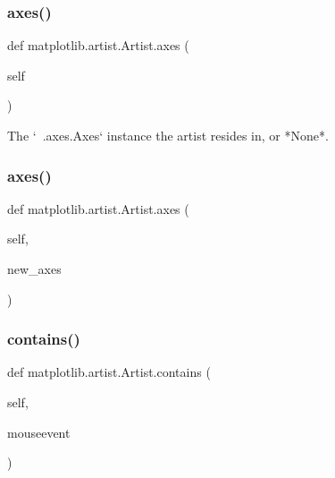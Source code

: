 \subsubsection{\texorpdfstring{axes()}{axes()}\hspace{0.1cm}{\footnotesize\ttfamily [1/2]}}
{\footnotesize\ttfamily def matplotlib.\+artist.\+Artist.\+axes (\begin{DoxyParamCaption}\item[{}]{self }\end{DoxyParamCaption})}

\begin{DoxyVerb}The `~.axes.Axes` instance the artist resides in, or *None*.\end{DoxyVerb}
 \mbox{\label{classmatplotlib_1_1artist_1_1Artist_a522c38874d287df85bbf5af7c770a3e7}} 
\subsubsection{\texorpdfstring{axes()}{axes()}\hspace{0.1cm}{\footnotesize\ttfamily [2/2]}}
{\footnotesize\ttfamily def matplotlib.\+artist.\+Artist.\+axes (\begin{DoxyParamCaption}\item[{}]{self,  }\item[{}]{new\+\_\+axes }\end{DoxyParamCaption})}

\mbox{\label{classmatplotlib_1_1artist_1_1Artist_a0147afb4ab2383f87c613a8790df3448}} 
\subsubsection{\texorpdfstring{contains()}{contains()}}
{\footnotesize\ttfamily def matplotlib.\+artist.\+Artist.\+contains (\begin{DoxyParamCaption}\item[{}]{self,  }\item[{}]{mouseevent }\end{DoxyParamCaption})}

